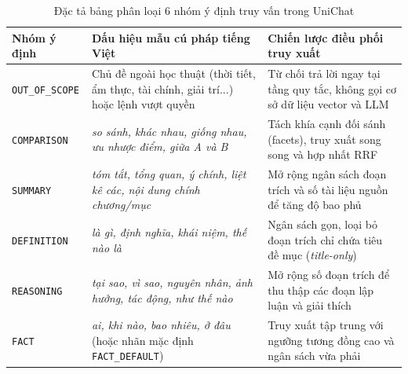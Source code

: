 \documentclass{IEEEtran}
\begin{document}
\begin{table}[t]
\caption{Đặc tả bảng phân loại 6 nhóm ý định truy vấn trong UniChat}
\label{tab:intent_details}
\centering
\scriptsize
\setlength{\tabcolsep}{3pt}
\begin{tabularx}{\columnwidth}{|L{2.25cm}|Y|Y|}
\hline
\textbf{Nhóm ý định} & \textbf{Dấu hiệu mẫu cú pháp tiếng Việt} & \textbf{Chiến lược điều phối truy xuất} \\
\hline
\texttt{OUT\_OF\_SCOPE} & Chủ đề ngoài học thuật (thời tiết, ẩm thực, tài chính, giải trí...) hoặc lệnh vượt quyền & Từ chối trả lời ngay tại tầng quy tắc, không gọi cơ sở dữ liệu vector và LLM \\
\hline
\texttt{COMPARISON} & \textit{so sánh, khác nhau, giống nhau, ưu nhược điểm, giữa A và B} & Tách khía cạnh đối sánh (facets), truy xuất song song và hợp nhất RRF \\
\hline
\texttt{SUMMARY} & \textit{tóm tắt, tổng quan, ý chính, liệt kê các, nội dung chính chương/mục} & Mở rộng ngân sách đoạn trích và số tài liệu nguồn để tăng độ bao phủ \\
\hline
\texttt{DEFINITION} & \textit{là gì, định nghĩa, khái niệm, thế nào là} & Ngân sách gọn, loại bỏ đoạn trích chỉ chứa tiêu đề mục (\textit{title-only}) \\
\hline
\texttt{REASONING} & \textit{tại sao, vì sao, nguyên nhân, ảnh hưởng, tác động, như thế nào} & Mở rộng số đoạn trích để thu thập các đoạn lập luận và giải thích \\
\hline
\texttt{FACT} & \textit{ai, khi nào, bao nhiêu, ở đâu} (hoặc nhãn mặc định \texttt{FACT\_DEFAULT}) & Truy xuất tập trung với ngưỡng tương đồng cao và ngân sách vừa phải \\
\hline
\end{tabularx}
\end{table}
\end{document}
